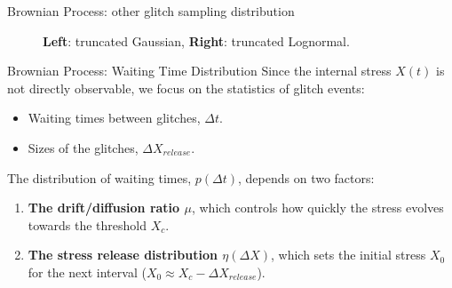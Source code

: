 \begin{frame}{Brownian Process: other glitch sampling distribution}
\begin{figure}
{        \textbf{Left}: truncated Gaussian, \textbf{Right}: truncated Lognormal.}
    \end{figure}
\end{frame}

\begin{frame}{Brownian Process: Waiting Time Distribution}
    Since the internal stress $X(t)$ is not directly observable, we focus on the statistics of glitch events:
    \begin{itemize}
        \item Waiting times between glitches, $\Delta t$.
        \item Sizes of the glitches, $\Delta X_{release}$.
    \end{itemize}
    
    \vspace{0.4cm}
    The distribution of waiting times, $p(\Delta t)$, depends on two factors:
    \begin{enumerate}
        \item \textbf{The drift/diffusion ratio $\mu$}, which controls how quickly the stress evolves towards the threshold $X_c$.
        \vspace{0.2cm}
        \item \textbf{The stress release distribution $\eta(\Delta X)$}, which sets the initial stress $X_0$ for the next interval ($X_0 \approx X_c - \Delta X_{release}$).
    \end{enumerate}
\end{frame}

